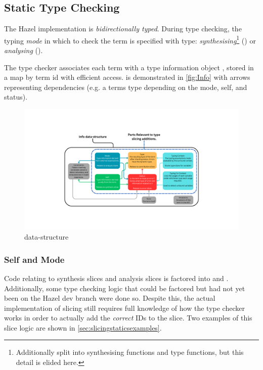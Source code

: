 \subsection{Static Type Checking}\label{sec:TypeChecking}
The Hazel implementation is \textit{bidirectionally typed}. During type checking, the typing \textit{mode} in which to check the term is specified with  type: \textit{synthesising}\footnote{Additionally split into synthesising functions and type functions, but this detail is elided here.} () or \textit{analysing} ().

The type checker associates each term with a type information object , stored in a map by term id with efficient access.  is demonstrated in \cref{fig:Info} with arrows representing dependencies (e.g. a terms type depending on the mode, self, and status).
\begin{figure}[h]
\includegraphics[width=1\textwidth, trim={8cm 5cm 8cm 5cm}, clip]{Media/Figures/info}
\caption{ data-structure}
\end{figure}

\subsubsection{Self and Mode}
Code relating to synthesis slices and analysis slices is factored into  and . Additionally, some type checking logic that could be factored but had not yet been on the Hazel dev branch were done so. Despite this, the actual implementation of slicing still requires full knowledge of how the type checker works in order to actually add the \textit{correct} IDs to the slice. Two examples of this slice logic are shown in \cref{sec:slicingstaticsexamples}.

